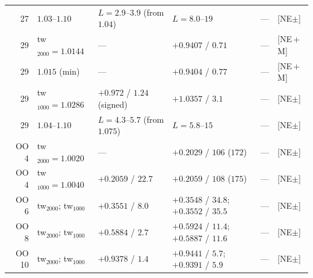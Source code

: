 \documentclass[aps,prl,onecolumn,superscriptaddress,nofootinbib]{revtex4-2}
\begin{document}
\begin{table}[!htbp]
\begin{ruledtabular}
\begin{tabular}{rlllll}
27 & $1.03$--$1.10$ & $L=2.9$--$3.9$ (from $1.04$) & $L=8.0$--$19$ & --- & [NE$\pm$]\\
29 & tw$_{2000}=1.0144$ & --- & $+0.9407$ / $0.71$ & --- & [NE\,+\,M]\\
29 & $1.015$ (min) & --- & $+0.9404$ / $0.77$ & --- & [NE\,+\,M]\\
29 & tw$_{1000}=1.0286$ & $+0.972$ / $1.24$ (signed) & $+1.0357$ / $3.1$ & --- & [NE$\pm$]\\
29 & $1.04$--$1.10$ & $L=4.3$--$5.7$ (from $1.075$) & $L=5.8$--$15$ & --- & [NE$\pm$]\\
OO 4 & tw$_{2000}=1.0020$ & --- & $+0.2029$ / $106$ ($172$) & --- & [NE$\pm$]\\
OO 4 & tw$_{1000}=1.0040$ & $+0.2059$ / $22.7$ & $+0.2059$ / $108$ ($175$) & --- & [NE$\pm$]\\
OO 6 & tw$_{2000}$; tw$_{1000}$ & $+0.3551$ / $8.0$ & $+0.3548$ / $34.8$; $+0.3552$ / $35.5$ & --- & [NE$\pm$]\\
OO 8 & tw$_{2000}$; tw$_{1000}$ & $+0.5884$ / $2.7$ & $+0.5924$ / $11.4$; $+0.5887$ / $11.6$ & --- & [NE$\pm$]\\
OO 10 & tw$_{2000}$; tw$_{1000}$ & $+0.9378$ / $1.4$ & $+0.9441$ / $5.7$; $+0.9391$ / $5.9$ & --- & [NE$\pm$]\\
\end{tabular}
\end{ruledtabular}
\end{table}
\end{document}
